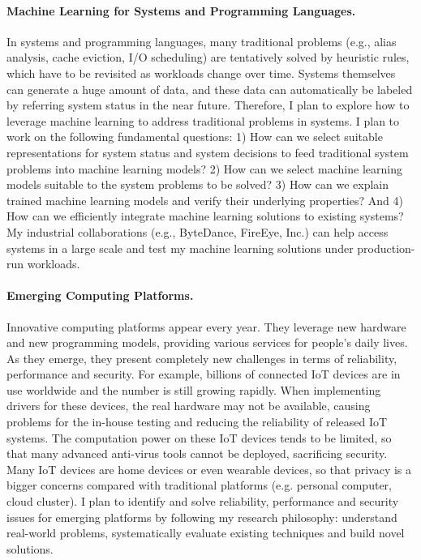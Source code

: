 \documentclass[10pt]{article}
\begin{document}
\vspace{-.1in}
\paragraph{Machine Learning for Systems and Programming Languages.} 
In systems and programming languages, 
many traditional problems (e.g., alias analysis, cache eviction, I/O scheduling) 
are tentatively solved by heuristic rules, which have to be revisited as 
workloads change over time. 
Systems themselves can generate a huge amount of data, 
and these data can automatically be labeled by 
referring system status in the near future. 
Therefore, I plan to explore how to leverage machine learning
to address traditional problems in systems.
I plan to work on the following fundamental questions:
1) How can we select suitable representations for system status 
and system decisions to feed traditional system problems 
into machine learning models?
2) How can we select machine learning models suitable 
to the system problems to be solved?
3) How can we explain trained machine learning models 
and verify their underlying properties?
And 4) How can we efficiently integrate machine 
learning solutions to existing systems?
My industrial collaborations (e.g., ByteDance, FireEye, Inc.) 
can help access systems in a large scale and test my machine learning 
solutions under production-run workloads. 

\vspace{-.1in}
\paragraph{Emerging Computing Platforms.} 
Innovative computing platforms appear every year. 
They leverage new hardware and new programming models,
providing various services for people's daily lives. 
As they emerge, they present completely new challenges 
in terms of reliability, performance and security.
For example, billions of connected IoT devices are in use worldwide
and the number is still growing rapidly. 
When implementing drivers for these devices, 
the real hardware may not be available, 
causing problems for the in-house testing 
and reducing the reliability of released IoT systems. 
The computation power on these IoT devices tends to be limited, 
so that many advanced anti-virus tools cannot be deployed, sacrificing security. 
Many IoT devices are home devices or even wearable devices,  
so that privacy is a bigger concerns compared 
with traditional platforms (e.g. personal computer, 
cloud cluster).
I plan to identify and solve reliability, performance and security issues 
for emerging platforms by following my research philosophy:
understand real-world problems, 
systematically evaluate existing techniques
and build novel solutions. 





\newpage


\end{document}
